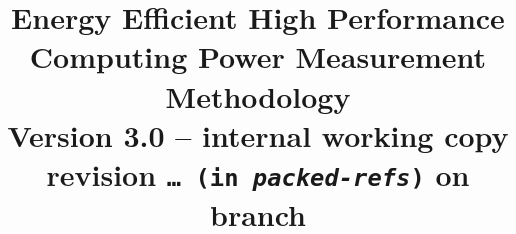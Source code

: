 \documentclass[runningheads]{scrreprt}
\newcommand{\commit}{\dots~(in \emph{packed-refs})}}
\begin{document}
\graphicspath{{figures/}}

\pagestyle{headings}  %

\title{
Energy Efficient High Performance Computing Power Measurement Methodology \\
\bigskip
\normalsize{Version 3.0 -- internal working copy}\\
\bigskip
\scriptsize{revision \texttt{\commit} on branch \texttt{\branch}}
}


\date{ }
\maketitle              %

\tableofcontents
\listoftables
\listoffigures

\newcommand{\SpecRateLThreeAC}{5~kHz}
\newcommand{\SpecRateLThreeDC}{120~Hz}
\newcommand{\SpecAccuracyLThree}{1\%}
\newcommand{\SpecAccuracyLTwo}{2\%}
\newcommand{\SpecAccuracyLOne}{5\%}
\newcommand{\SpecAccuracyMeter}{3\%}
\newcommand{\SpecPowerMinLOne}{2~kW}
\newcommand{\SpecPowerMinLTwo}{10~kW}
\newcommand{\SpecPowerMaxLOne}{40~kW}
\newcommand{\SpecFracMinLOne}{$\frac{1}{10}$}
\newcommand{\SpecFracMinLTwo}{$\frac{1}{8}$}
\newcommand{\SpecMinNodes}{15}
\newcommand{\MinMeasurementsCorePhaseLTwoThree}{10}
\newcommand{\MaxReadingIntervalCorePhaseLTwoThree}{10\%}
\newcommand{\MaxSecMissingLThree}{10}
\newcommand{\MaxSecMissingLThreeHalf}{5} %

%



\newpage




\end{document}

